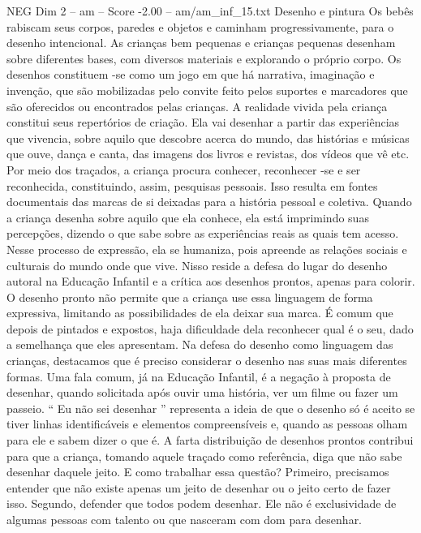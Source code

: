 \begin{textsample}{NEG Dim 2 – am – Score -2.00 – am/am\_inf\_15.txt}  \label{ex:f2_neg_136}
Desenho e pintura Os bebês rabiscam seus corpos, paredes e objetos e caminham progressivamente, para o desenho intencional.
As crianças bem pequenas e crianças pequenas desenham sobre diferentes bases, com diversos materiais e explorando o próprio corpo.
Os desenhos constituem -se como um jogo em que há narrativa, imaginação e invenção, que são mobilizadas pelo convite feito pelos suportes e marcadores que são oferecidos ou encontrados pelas crianças.
A realidade vivida pela criança constitui seus repertórios de criação.
Ela vai desenhar a partir das experiências que vivencia, sobre aquilo que descobre acerca do mundo, das histórias e músicas que ouve, dança e canta, das imagens dos livros e revistas, dos vídeos que vê etc.
Por meio dos traçados, a criança procura conhecer, reconhecer -se e ser reconhecida, constituindo, assim, pesquisas pessoais.
Isso resulta em fontes documentais das marcas de si deixadas para a história pessoal e coletiva.
Quando a criança desenha sobre aquilo que ela conhece, ela está imprimindo suas percepções, dizendo o que sabe sobre as experiências reais as quais tem acesso.
Nesse processo de expressão, ela se humaniza, pois apreende as relações sociais e culturais do mundo onde que vive.
Nisso reside a defesa do lugar do desenho autoral na Educação Infantil e a crítica aos desenhos prontos, apenas para colorir.
O desenho pronto não permite que a criança use essa linguagem de forma expressiva, limitando as possibilidades de ela deixar sua marca.
É comum que depois de pintados e expostos, haja dificuldade dela reconhecer qual é o seu, dado a semelhança que eles apresentam.
Na defesa do desenho como linguagem das crianças, destacamos que é preciso considerar o desenho nas suas mais diferentes formas.
Uma fala comum, já na Educação Infantil, é a negação à proposta de desenhar, quando solicitada após ouvir uma história, ver um filme ou fazer um passeio. “ Eu não sei desenhar ” representa a ideia de que o desenho só é aceito se tiver linhas identificáveis e elementos compreensíveis e, quando as pessoas olham para ele e sabem dizer o que é.
A farta distribuição de desenhos prontos contribui para que a criança, tomando aquele traçado como referência, diga que não sabe desenhar daquele jeito.
E como trabalhar essa questão?
Primeiro, precisamos entender que não existe apenas um jeito de desenhar ou o jeito certo de fazer isso.
Segundo, defender que todos podem desenhar.
Ele não é exclusividade de algumas pessoas com talento ou que nasceram com dom para desenhar.

\end{textsample}

